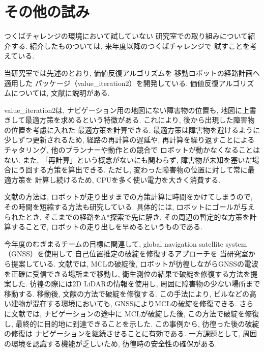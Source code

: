 \documentclass[twocolumn,9pt]{jsproceedings}
\begin{document}
\section{その他の試み}

つくばチャレンジの環境において試していない
研究室での取り組みについて紹介する. 
紹介したものついては, 来年度以降のつくばチャレンジで
試すことを考えている. 

当研究室では先述のとおり, 価値反復アルゴリズムを
移動ロボットの経路計画へ適用した
パッケージ（value\_iteration2\cite{value_iteration2}）を開発している\cite{ueda2023JRM}. 
価値反復アルゴリズムについては, 
文献\cite{上田詳解}に説明がある. 

value\_iteration2は, 
ナビゲーション用の地図にない障害物の位置も, 
地図に上書きして最適方策を求めるという特徴がある. 
これにより, 後から出現した障害物の位置を考慮に入れた
最適方策を計算できる. 
最適方策は障害物を避けるように少しずつ更新されるため, 
経路の再計算の遅延や, 再計算を繰り返すことによるチャタリング, 
他のプランナーや動作との競合で
ロボットが動かなくなることはない. 
また, 「再計算」という概念がないにも関わらず, 
障害物が未知を塞いだ場合にう回する方策を算出できる. 
ただし, 変わった障害物の位置に対して常に最適方策を
計算し続けるため, CPUを多く使い電力を大きく消費する. 

文献\cite{ueda2023JRM}の方法は, 
ロボットが走り出すまでの方策計算に時間をかけてしまうので, 
その時間を短縮する方法も研究している\cite{中村2024}. 
具体的には, ロボットにゴールが与えられたとき, 
そこまでの経路をA*探索で先に解き, 
その周辺の暫定的な方策を計算することで, 
ロボットの走り出しを早めるというものである. 

今年度のむぎまるチームの目標に関連して, 
global navigation satellite system（GNSS）を使用して
自己位置推定の破綻を修復するアプローチを
当研究室から提案している\cite{吉越2024}\cite{吉越2025}. 
文献\cite{吉越2024}では, MCLの破綻後, 
ロボットが彷徨しながらGNSSの電波を正確に受信できる場所まで移動し, 
衛生測位の結果で破綻を修復する方法を提案した. 
彷徨の際には2D LiDARの情報を使用し, 
周囲に障害物の少ない場所まで移動する. 
移動後, 文献\cite{goto2018}の方法で破綻を修復する. 
この手法により, 
ビルなどの高い建物が混在する環境においても, 
GNSSによりMCLの破綻を修復できる. 
さらに文献\cite{吉越2025}では, ナビゲーションの途中に
MCLが破綻した後, この方法で破綻を修復し, 
最終的に目的地に到達できることを示した. 
この事例から, 彷徨った後の破綻の修復は
ナビゲーションを継続させることに有効である. 
一方課題として, 周囲の環境を認識する機能が乏しいため, 
彷徨時の安全性の確保がある. 
\end{document}

